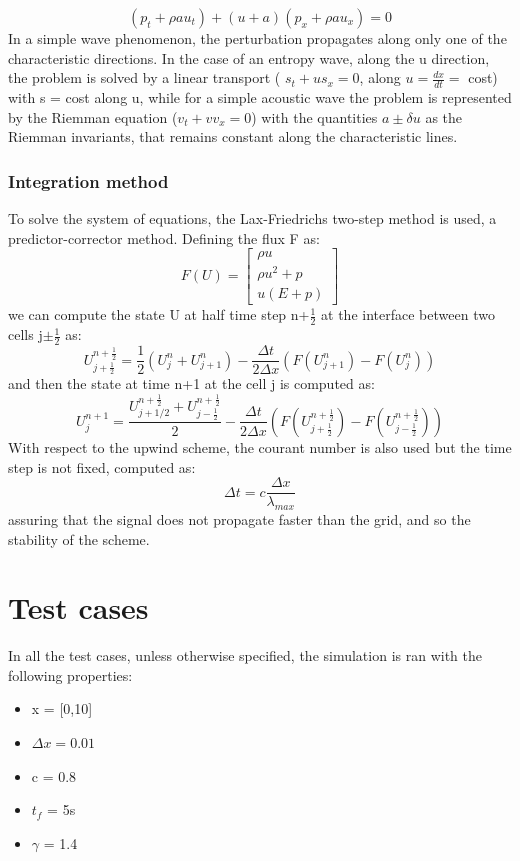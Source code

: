 \documentclass{report}
\begin{document}
\begin{equation*}
    (p_t + \rho a u_t) + (u + a) (p_x + \rho a u_x) = 0
\end{equation*}
In a simple wave phenomenon, the perturbation propagates along only one of the characteristic directions.
In the case of an entropy wave, along the u direction, the problem is solved by a linear transport ( $ s_t + u s_x = 0$, along $u = \frac{dx}{dt} =$ cost) with s = cost along u, while
for a simple acoustic wave the problem is represented by the Riemman equation ($v_t + v v_x = 0$) with 
the quantities $ a \pm \delta u$ as the Riemman invariants, that remains constant along the characteristic lines.\\

\subsubsection{Integration method}
To solve the system of equations, the Lax-Friedrichs two-step method is used, a predictor-corrector method.
Defining the flux F as:
\begin{equation*}
    F(U) = \begin{bmatrix}
        \rho u \\
        \rho u^2 + p \\
        u (E + p)
    \end{bmatrix}
\end{equation*}
we can compute the state U at half time step n+$\frac{1}{2}$ at the interface between two cells j$\pm\frac{1}{2}$ as:
\begin{equation*}
    U^{n+\frac{1}{2}}_{j+\frac{1}{2}} = \frac{1}{2} (U^n_j + U^n_{j+1}) - \frac{\Delta t}{2\Delta x} (F(U^n_{j+1}) - F(U^n_j))
\end{equation*}
and then the state at time n+1 at the cell j is computed as:
\begin{equation*}
    U^{n+1}_j = \frac{U_{j+1/2}^{n+\frac{1}{2}} + U_{j-\frac{1}{2}}^{n+\frac{1}{2}}}{2} - \frac{\Delta t}{2\Delta x} (F(U_{j+\frac{1}{2}}^{n+\frac{1}{2}}) - F(U_{j-\frac{1}{2}}^{n+\frac{1}{2}}))
\end{equation*}
With respect to the upwind scheme, the courant number is also used but the time step is not fixed, computed as:
\begin{equation*}
    \Delta t = c \frac{\Delta x}{\lambda_{max}}
\end{equation*}
assuring that the signal does not propagate faster than the grid, and so the stability of the scheme.
\section*{Test cases}
In all the test cases, unless otherwise specified, the simulation is ran with the following properties:
\begin{itemize}[label={}]
    \item x = [0,10]
    \item $\Delta x = 0.01$
    \item c = 0.8
    \item $t_f$ = 5s
    \item $\gamma$ = 1.4
\end{itemize}
\end{document}
